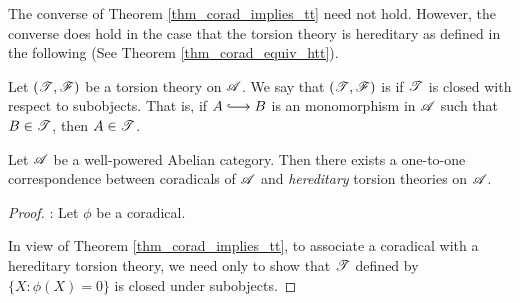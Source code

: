 The converse of Theorem \ref{thm_corad_implies_tt} need not hold. 
However, the converse does hold in the case that the torsion 
theory is hereditary as defined in the following 
(See Theorem \ref{thm_corad_equiv_htt}).

\begin{defn}
Let $(\mathscr{T}, \mathscr{F})$ be a torsion theory on $\mathscr{A}$. We say 
that $(\mathscr{T}, \mathscr{F})$ is  if $\mathscr{T}$ is 
closed with respect to subobjects. That is, if $A \into B$ is an 
monomorphism in $\mathscr{A}$ such that $B \in \mathscr{T}$, then $A \in 
\mathscr{T}$.
\end{defn}

\begin{thm}\label{thm_corad_equiv_htt}
Let $\mathscr{A}$ be a well-powered Abelian category. Then there 
exists a one-to-one correspondence between coradicals of $\mathscr{A}$ 
and \emph{hereditary} torsion theories on $\mathscr{A}$.
\end{thm}
\begin{proof}

 : Let 
$\phi$ be a coradical.

In view of Theorem \ref{thm_corad_implies_tt}, to associate a 
coradical with a hereditary torsion theory, we need only to show
that $\mathscr{T}$ defined by $\{X : \phi(X) = 0\}$ is closed under
subobjects.
\end{proof}
